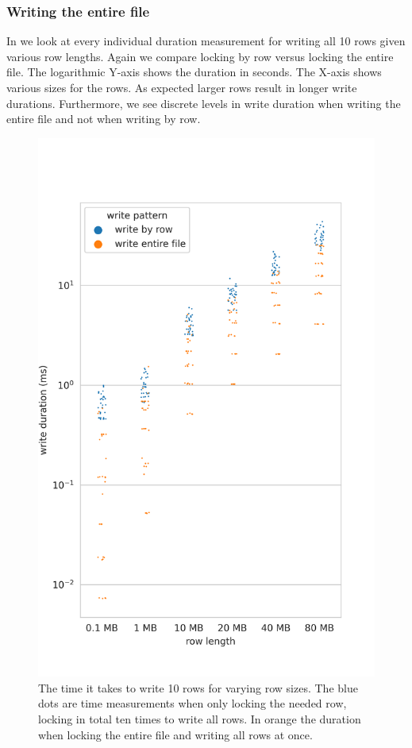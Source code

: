 \subsubsection{Writing the entire file}
In  we look at every individual duration measurement for writing all 10 rows given various row lengths. Again we compare locking by row versus locking the entire file. The logarithmic Y-axis shows the duration in seconds. The X-axis shows various sizes for the rows. As expected larger rows result in longer write durations. Furthermore, we see discrete levels in write duration when writing the entire file and not when writing by row.
%
\begin{figure}[htbp]
	\centering
	\includegraphics[height=\textheight]{../results/plots/range_vs_row_len.png}
	\caption{The time it takes to write 10 rows for varying row sizes. The blue dots are time measurements when only locking the needed row, locking in total ten times to write all rows. In orange the duration when locking the entire file and writing all rows at once.}
	\label{fig:rowlen}
\end{figure}%

